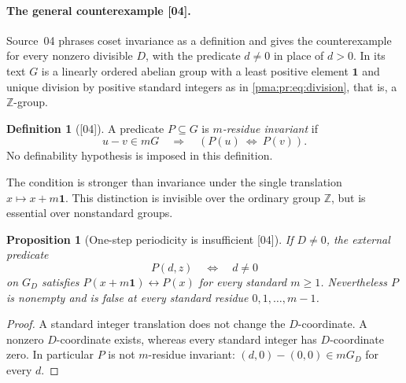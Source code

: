 \documentclass[11pt]{article}
\numberwithin{equation}{section}
\newtheorem{proposition}[proposition]{Proposition}
\theoremstyle{definition}
\newtheorem{definition}[definition]{Definition}
\theoremstyle{remark}
\newcommand{\Z}{\mathbb Z}
\newcommand{\one}{\mathbf 1}
\newcommand{\src}[1]{\textup{\textsf{\small[#1]}}}
\begin{document}
\paragraph{The general counterexample \src{04}.} Source~04 phrases coset
invariance as a definition and gives the counterexample for every nonzero
divisible $D$, with the predicate $d\ne0$ in place of $d>0$. In its text $G$
is a linearly ordered abelian group with a least positive element $\one$ and
unique division by positive standard integers as in
\eqref{pma:pr:eq:division}, that is, a $\Z$-group.

\begin{definition}[\src{04}]\label{pma:pr:def:residueinvariance}
A predicate $P\subseteq G$ is \emph{$m$-residue invariant} if
\[
 u-v\in mG\quad\Longrightarrow\quad(P(u)\ \Longleftrightarrow\ P(v)).
\]
No definability hypothesis is imposed in this definition.
\end{definition}

The condition is stronger than invariance under the single translation
$x\mapsto x+m\one$. This distinction is invisible over the ordinary group
$\Z$, but is essential over nonstandard groups.

\begin{proposition}[One-step periodicity is insufficient \src{04}]\label{pma:pr:prop:periodicity}
If $D\ne0$, the external predicate
\[
 P(d,z)\quad\Longleftrightarrow\quad d\ne0
\]
on $G_D$ satisfies $P(x+m\one)\leftrightarrow P(x)$ for every standard
$m\geq1$. Nevertheless $P$ is nonempty and is false at every standard
residue $0,1,\ldots,m-1$.
\end{proposition}

\begin{proof}
A standard integer translation does not change the $D$-coordinate. A
nonzero $D$-coordinate exists, whereas every standard integer has
$D$-coordinate zero. In particular $P$ is not $m$-residue invariant:
$(d,0)-(0,0)\in mG_D$ for every $d$.
\end{proof}
\end{document}
